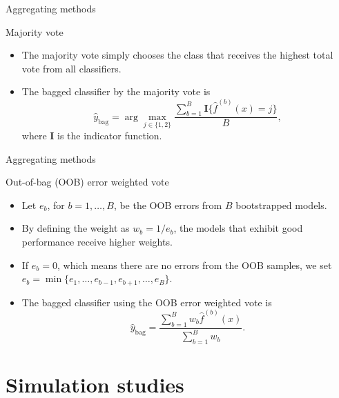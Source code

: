 \documentclass{beamer}
\begin{document}
\begin{frame}{Aggregating methods}
	\begin{block}{Majority vote}
		\begin{itemize}
			\item{
				The majority vote simply chooses the class that receives the highest total vote from all classifiers.
			}
			\item{
				The bagged classifier by the majority vote is 
				\begin{equation*}
				\hat y_{\text{bag}} = \arg\max_{ j \in \{1,2\} }  \frac{ \sum_{b=1}^B \mathbf I \big\{ \hat f^{(b)}(x) = j  \big\} }{B}, 
				\end{equation*}
				where $\mathbf I$ is the indicator function. 
			}
		\end{itemize}
	\end{block}
\end{frame}

\begin{frame}{Aggregating methods}
	\begin{block}{Out-of-bag (OOB) error weighted vote \citep{Pham2018}}
		\begin{itemize}
			\item{
				Let $e_b$, for $b=1, \dots, B$, be the OOB errors from $B$ bootstrapped models.
			}
			\item{
				By defining the weight as $w_b = 1/e_b$, the models that exhibit good performance receive higher weights.
			}
			\item{
				If $e_b = 0$, which means there are no errors from the OOB samples, we set $e_b = \min \{ e_1, \dots, e_{b-1}, e_{b+1}, \dots, e_B \}$.
			}
			\item{
				The bagged classifier using the OOB error weighted vote is
				\begin{equation*}
				\hat y_{\text{bag}} = \frac{\sum_{b=1}^B w_b \hat f^{(b)}(x)}{\sum_{b=1}^B w_b}.
				\end{equation*}
			}
		\end{itemize}
	\end{block}
\end{frame}


\section{Simulation studies}
\end{document}
